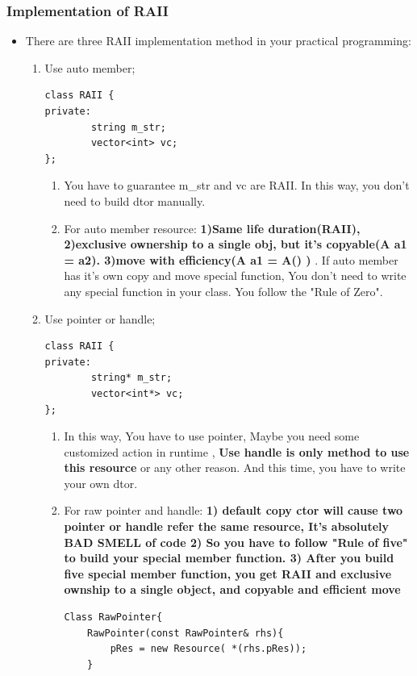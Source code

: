 \documentclass[a4paper,11pt,twoside]{book}
\begin{document}
\subsubsection{Implementation of RAII}

\begin{itemize}

	\item There are three RAII implementation method in your practical programming:
	\begin{enumerate}
		\item Use auto member; 
\begin{lstlisting}[numbers=none]
class RAII {
private:
		string m_str;
		vector<int> vc;
};
\end{lstlisting}
			\begin{enumerate}
				\item You have to guarantee m\_str and vc are RAII.  In this way, you don't need to build dtor manually.
				
				\item For auto member resource: \textbf{1)Same life duration(RAII), 2)exclusive ownership to a single obj, but it's copyable(A a1 = a2).  3)move with efficiency(A a1 = A() ) }. If auto member has it's own copy and move special function, You don't need to write any special function in your class. You follow the "Rule of Zero".
			\end{enumerate}
		
		\item Use pointer or handle; 
\begin{lstlisting}[numbers=none]
class RAII {
private:
		string* m_str;
		vector<int*> vc;
};
\end{lstlisting}
			\begin{enumerate}
				\item In this way, You have to use pointer, Maybe you need some customized action in runtime , \textbf{Use handle is only method to use this resource} or any other reason. And this time, you have to write your own dtor.
				
				\item For raw pointer and handle: \textbf{1) default copy ctor will cause two pointer or handle refer the same resource, It's absolutely BAD SMELL of code 2) So you have to follow "Rule of five" to build your special member function. 3) After you build five special member function, you get RAII and exclusive ownship to a single object, and copyable and efficient move}
\begin{lstlisting}[numbers=none]
Class RawPointer{
	RawPointer(const RawPointer& rhs){
		pRes = new Resource( *(rhs.pRes));
	}
				

\end{lstlisting}
\end{enumerate}
\end{enumerate}
\end{itemize}
\end{document}
